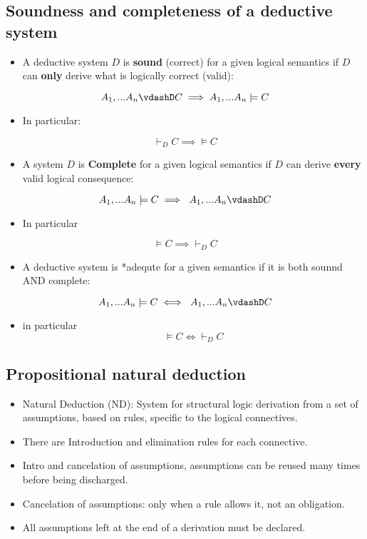 \documentclass[11pt]{article}
\begin{document}
\subsection{Soundness and completeness of a deductive system}
\label{sec:orge2f9323}
\begin{itemize}
\item A deductive system \(D\) is \textbf{sound} (correct) for a given logical semantics if \(D\) can \textbf{\textbf{only}} derive what is logically correct (valid):
\end{itemize}
\[A_1,...A_n \vdashD C \implies A_1, ... A_n \models C\]
\begin{itemize}
\item In particular:
\end{itemize}
\[\vdash_D C \implies \models C\]

\begin{itemize}
\item A system \(D\) is \textbf{Complete} for a given logical semantics if \(D\) can derive \textbf{every} valid logical consequence:
\end{itemize}
\[ A_1, ... A_n \models C \implies\ A_1,...A_n \vdashD C\]
\begin{itemize}
\item In particular
\end{itemize}
\[\models C \implies \vdash_D C \]
\begin{itemize}
\item A deductive system is *adequte for a given semantics if it is both sounnd AND complete:
\end{itemize}
\[ A_1, ... A_n \models C \iff \ A_1,...A_n \vdashD C\]
\begin{itemize}
\item in particular \[\models C \iff \vdash_D C \]
\end{itemize}
\subsection{Propositional natural deduction}
\label{sec:org73ef3b8}
\begin{itemize}
\item Natural Deduction (ND): System for structural logic derivation from a set of assumptions, based on rules, specific to the logical connectives.
\item There are Introduction and elimination rules for each connective.
\item Intro and cancelation of assumptions, assumptions can be reused many times  before being discharged.
\item Cancelation of assumptions: only when a rule allows it, not an obligation.
\item All assumptions left at the end of a derivation must be declared.
\end{itemize}
\end{document}
